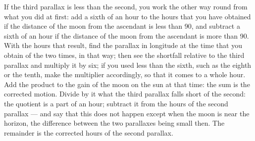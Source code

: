 \documentclass[11pt]{article}
\begin{document}
\par If the third parallax is less than the second, you work the other way round from what you did at first: add a sixth of an hour to the hours that you have obtained if the distance of the moon from the ascendant is less than 90, and subtract a sixth of an hour if the distance of the moon from the ascendant is more than 90. With the hours that result, find the parallax in longitude at the time that you obtain of the two times, in that way; then see the shortfall relative to the third parallax and multiply it by six; if you used less than the sixth, such as the eighth or the tenth, make the multiplier accordingly, so that it comes to a whole hour. Add the product to the gain of the moon on the sun at that time: the sum is the corrected motion. Divide by it what the third parallax falls short of the second: the quotient is a part of an hour; subtract it from the hours of the second parallax — and say that this does not happen except when the moon is near the horizon, the difference between the two parallaxes being small then. The remainder is the corrected hours of the second parallax.\par
\end{document}
